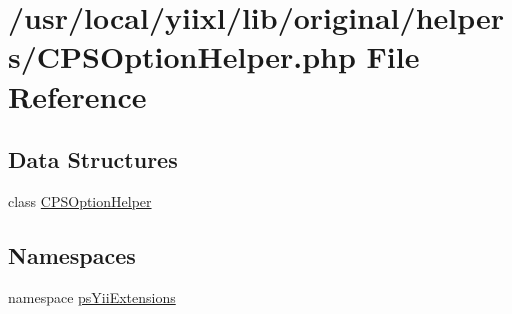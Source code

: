 \hypertarget{CPSOptionHelper_8php}{
\section{/usr/local/yiixl/lib/original/helpers/CPSOptionHelper.php File Reference}
\label{CPSOptionHelper_8php}
}
\subsection*{Data Structures}
\begin{DoxyCompactItemize}
\item 
class \hyperlink{classCPSOptionHelper}{CPSOptionHelper}
\end{DoxyCompactItemize}
\subsection*{Namespaces}
\begin{DoxyCompactItemize}
\item 
namespace \hyperlink{namespacepsYiiExtensions}{psYiiExtensions}
\end{DoxyCompactItemize}
